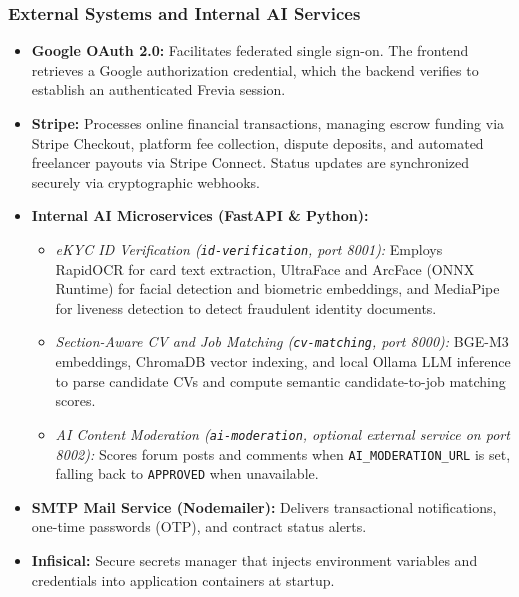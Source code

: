 \subsubsection*{External Systems and Internal AI Services}
\begin{itemize}[leftmargin=*]
    \item \textbf{Google OAuth 2.0:} Facilitates federated single sign-on. The frontend retrieves a Google authorization credential, which the backend verifies to establish an authenticated Frevia session.
    \item \textbf{Stripe:} Processes online financial transactions, managing escrow funding via Stripe Checkout, platform fee collection, dispute deposits, and automated freelancer payouts via Stripe Connect. Status updates are synchronized securely via cryptographic webhooks.
    \item \textbf{Internal AI Microservices (FastAPI \& Python):}
    \begin{itemize}[leftmargin=*]
        \item \textit{eKYC ID Verification (\texttt{id-verification}, port 8001):} Employs RapidOCR for card text extraction, UltraFace and ArcFace (ONNX Runtime) for facial detection and biometric embeddings, and MediaPipe for liveness detection to detect fraudulent identity documents.
        \item \textit{Section-Aware CV and Job Matching (\texttt{cv-matching}, port 8000):} BGE-M3 embeddings, ChromaDB vector indexing, and local Ollama LLM inference to parse candidate CVs and compute semantic candidate-to-job matching scores.
        \item \textit{AI Content Moderation (\texttt{ai-moderation}, optional external service on port 8002):} Scores forum posts and comments when \texttt{AI\_\allowbreak{}MODERATION\_\allowbreak{}URL} is set, falling back to \texttt{APPROVED} when unavailable.
    \end{itemize}
    \item \textbf{SMTP Mail Service (Nodemailer):} Delivers transactional notifications, one-time passwords (OTP), and contract status alerts.
    \item \textbf{Infisical:} Secure secrets manager that injects environment variables and credentials into application containers at startup.
\end{itemize}

